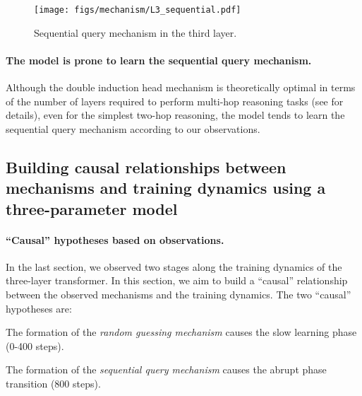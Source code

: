 \begin{figure}[h]
    \centering
    \texttt{[image: figs/mechanism/L3\_sequential.pdf]}
    \caption{Sequential query mechanism in the third layer.}
    \label{fig:mech:L3_sequential}
\end{figure}

\paragraph{The model is prone to learn the sequential query mechanism.} Although the double induction head mechanism is theoretically optimal in terms of the number of layers required to perform multi-hop reasoning tasks (see  for details), even for the simplest two-hop reasoning, the model tends to learn the sequential query mechanism according to our observations. 

\subsection{Building causal relationships between mechanisms and training dynamics using a three-parameter model}
\label{sec:three_param_model}

\paragraph{``Causal'' hypotheses based on observations.} In the last section, we observed two stages along the training dynamics of the three-layer transformer. In this section, we aim to build a ``causal'' relationship between the observed mechanisms and the training dynamics. The two ``causal'' hypotheses are:
\begin{hypothesis}\label{hyp:random-guess}
The formation of the \textit{random guessing mechanism} causes the slow learning phase (0-400 steps).
\end{hypothesis}
\begin{hypothesis}\label{hyp:sequential-query}
The formation of the \textit{sequential query mechanism} causes the abrupt phase transition (800 steps).
\end{hypothesis}

